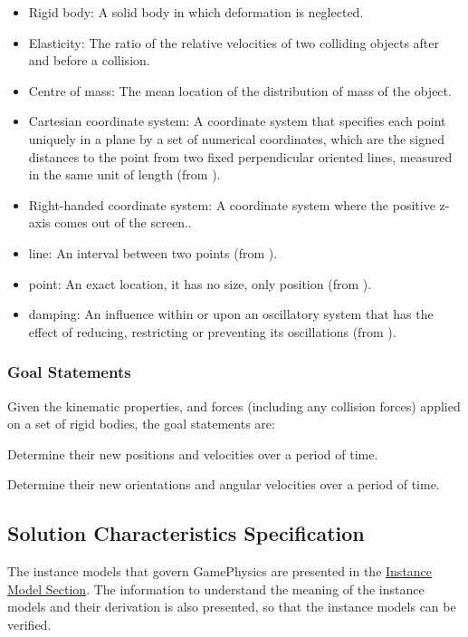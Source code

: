 \documentclass[12pt]{article}
\begin{document}
\begin{itemize}
\item{Rigid body: A solid body in which deformation is neglected.}
\item{Elasticity: The ratio of the relative velocities of two colliding objects after and before a collision.}
\item{Centre of mass: The mean location of the distribution of mass of the object.}
\item{Cartesian coordinate system: A coordinate system that specifies each point uniquely in a plane by a set of numerical coordinates, which are the signed distances to the point from two fixed perpendicular oriented lines, measured in the same unit of length (from \cite{cartesianWiki}).}
\item{Right-handed coordinate system: A coordinate system where the positive z-axis comes out of the screen..}
\item{line: An interval between two points (from \cite{lineSource}).}
\item{point: An exact location, it has no size, only position (from \cite{pointSource}).}
\item{damping: An influence within or upon an oscillatory system that has the effect of reducing, restricting or preventing its oscillations (from \cite{dampingSource}).}
\end{itemize}
\subsubsection{Goal Statements}
\label{Sec:GoalStmt}
Given the kinematic properties, and forces (including any collision forces) applied on a set of rigid bodies, the goal statements are:

\begin{description}[font=\normalfont]
\item[Determine-Linear-Properties:\phantomsection\label{linearGS}]{Determine their new positions and velocities over a period of time.}
\item[Determine-Angular-Properties:\phantomsection\label{angularGS}]{Determine their new orientations and angular velocities over a period of time.}
\end{description}
\subsection{Solution Characteristics Specification}
\label{Sec:SolCharSpec}
The instance models that govern GamePhysics are presented in the \hyperref[Sec:IMs]{Instance Model Section}. The information to understand the meaning of the instance models and their derivation is also presented, so that the instance models can be verified.
\end{document}
